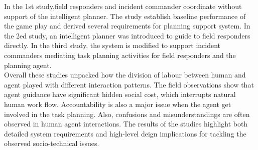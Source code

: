 In the 1st study,field responders and incident commander coordinate without support of the intelligent planner. The study establish baseline performance of the game play and derived several requirements for planning support system. In the 2ed study, an intelligent planner was introduced to guide to field responders directly. In the third study, the system is modified to support incident commanders mediating task planning activities for field responders and the planning agent. \\

Overall these studies unpacked how the division of labour between human and agent played with different interaction patterns. The field observations show that agent guidance have significant hidden social cost, which interrupts natural human work flow. Accountability is also a major issue when the agent get involved in the task planning. Also, confusions and misunderstandings are often observed in human agent interactions. The results of the studies highlight both detailed system requirements and high-level deign implications for tackling the observed socio-technical issues.\\  


\endgroup			

\vfill